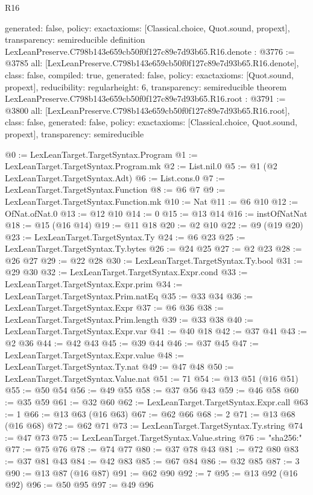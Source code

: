 \begin{lexlean}{R16}
\begin{coremodule}
{  generated: false,
  policy: exact{axioms: [Classical.choice, Quot.sound, propext]},
  transparency: semireducible
}
definition LexLeanPreserve.C798b143e659cb50f0f127c89e7d93b65.R16.denote : @3776 := @3785 {
  all: [LexLeanPreserve.C798b143e659cb50f0f127c89e7d93b65.R16.denote],
  class: false,
  compiled: true,
  generated: false,
  policy: exact{axioms: [Quot.sound, propext]},
  reducibility: regular{height: 6},
  transparency: semireducible
}
theorem LexLeanPreserve.C798b143e659cb50f0f127c89e7d93b65.R16.root : @3791 := @3800 {
  all: [LexLeanPreserve.C798b143e659cb50f0f127c89e7d93b65.R16.root],
  class: false,
  generated: false,
  policy: exact{axioms: [Classical.choice, Quot.sound, propext]},
  transparency: semireducible
}

@0 := LexLeanTarget.TargetSyntax.Program
@1 := LexLeanTarget.TargetSyntax.Program.mk
@2 := List.nil.{0}
@5 := @1 (@2 LexLeanTarget.TargetSyntax.Adt)
@6 := List.cons.{0}
@7 := LexLeanTarget.TargetSyntax.Function
@8 := @6 @7
@9 := LexLeanTarget.TargetSyntax.Function.mk
@10 := Nat
@11 := @6 @10
@12 := OfNat.ofNat.{0}
@13 := @12 @10
@14 := 0
@15 := @13 @14
@16 := instOfNatNat
@18 := @15 (@16 @14)
@19 := @11 @18
@20 := @2 @10
@22 := @9 (@19 @20)
@23 := LexLeanTarget.TargetSyntax.Ty
@24 := @6 @23
@25 := LexLeanTarget.TargetSyntax.Ty.bytes
@26 := @24 @25
@27 := @2 @23
@28 := @26 @27
@29 := @22 @28
@30 := LexLeanTarget.TargetSyntax.Ty.bool
@31 := @29 @30
@32 := LexLeanTarget.TargetSyntax.Expr.cond
@33 := LexLeanTarget.TargetSyntax.Expr.prim
@34 := LexLeanTarget.TargetSyntax.Prim.natEq
@35 := @33 @34
@36 := LexLeanTarget.TargetSyntax.Expr
@37 := @6 @36
@38 := LexLeanTarget.TargetSyntax.Prim.length
@39 := @33 @38
@40 := LexLeanTarget.TargetSyntax.Expr.var
@41 := @40 @18
@42 := @37 @41
@43 := @2 @36
@44 := @42 @43
@45 := @39 @44
@46 := @37 @45
@47 := LexLeanTarget.TargetSyntax.Expr.value
@48 := LexLeanTarget.TargetSyntax.Ty.nat
@49 := @47 @48
@50 := LexLeanTarget.TargetSyntax.Value.nat
@51 := 71
@54 := @13 @51 (@16 @51)
@55 := @50 @54
@56 := @49 @55
@58 := @37 @56 @43
@59 := @46 @58
@60 := @35 @59
@61 := @32 @60
@62 := LexLeanTarget.TargetSyntax.Expr.call
@63 := 1
@66 := @13 @63 (@16 @63)
@67 := @62 @66
@68 := 2
@71 := @13 @68 (@16 @68)
@72 := @62 @71
@73 := LexLeanTarget.TargetSyntax.Ty.string
@74 := @47 @73
@75 := LexLeanTarget.TargetSyntax.Value.string
@76 := "sha256:"
@77 := @75 @76
@78 := @74 @77
@80 := @37 @78 @43
@81 := @72 @80
@83 := @37 @81 @43
@84 := @42 @83
@85 := @67 @84
@86 := @32 @85
@87 := 3
@90 := @13 @87 (@16 @87)
@91 := @62 @90
@92 := 7
@95 := @13 @92 (@16 @92)
@96 := @50 @95
@97 := @49 @96

\end{coremodule}
\end{lexlean}
